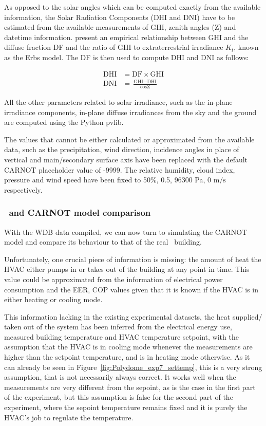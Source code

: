 As opposed to the solar angles which can be computed exactly from the available
information, the Solar Radiation Components (DHI and DNI) have to be estimated
from the available measurements of GHI, zenith angles (Z) and datetime
information.  \textcite{erbsEstimationDiffuseRadiation1982} present an empirical
relationship between GHI and the diffuse fraction DF and the ratio of GHI to
extraterrestrial irradiance $K_t$, known as the Erbs model. The DF is then used
to compute DHI and DNI as follows:

\begin{equation}
    \begin{aligned}
        \text{DHI} &= \text{DF} \times \text{GHI} \\
        \text{DNI} &= \frac{\text{GHI} - \text{DHI}}{\cos{\text{Z}}}
    \end{aligned}
\end{equation}

All the other parameters related to solar irradiance, such as the in-plane
irradiance components, in-plane diffuse irradiances from the sky and the ground
are computed using the Python pvlib.

The values that cannot be either calculated or approximated from the available
data, such as the precipitation, wind direction, incidence angles in place of
vertical and main/secondary surface axis have been replaced with the default
CARNOT placeholder value of -9999. The relative humidity, cloud index, pressure
and wind speed have been fixed to 50\%, 0.5, 96300 Pa, 0 $\text{m}/\text{s}$
respectively.

\subsubsection{\pdome\ and CARNOT model comparison}\label{sec:CARNOT_comparison}

With the WDB data compiled, we can now turn to simulating the CARNOT model and
compare its behaviour to that of the real \pdome\ building. 

Unfortunately, one crucial piece of information is missing: the amount of heat
the HVAC either pumps in or takes out of the building at any point in time. This
value could be approximated from the information of electrical power consumption
and the EER, COP values given that it is known if the HVAC is in either heating
or cooling mode. 

This information lacking in the existing experimental datasets, the heat
supplied/ taken out of the system has been inferred from the electrical energy
use, measured building temperature and HVAC temperature setpoint, with the
assumption that the HVAC is in cooling mode whenever the measurements are
higher than the setpoint temperature, and is in heating mode otherwise. As it
can already be seen in Figure~\ref{fig:Polydome_exp7_settemp}, this is a very
strong assumption, that is not necessarily always correct. It works well when
the measurements are very different from the sepoint, as is the case in the
first part of the experiment, but this assumption is false for the second part
of the experiment, where the sepoint temperature remains fixed and it is purely
the HVAC's job to regulate the temperature.

